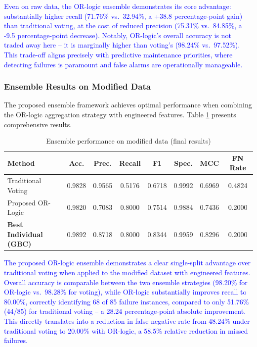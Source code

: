 \documentclass[final,5p, twocolumn]{elsarticle}
\begin{document}
\textcolor{blue}{Even on raw data, the OR-logic ensemble demonstrates its core advantage: substantially higher recall (71.76\% vs.\ 32.94\%, a +38.8 percentage-point gain) than traditional voting, at the cost of reduced precision (75.31\% vs.\ 84.85\%, a -9.5 percentage-point decrease). Notably, OR-logic's overall accuracy is not traded away here -- it is marginally higher than voting's (98.24\% vs.\ 97.52\%). This trade-off aligns precisely with predictive maintenance priorities, where detecting failures is paramount and false alarms are operationally manageable.}

\subsubsection{Ensemble Results on Modified Data}

The proposed ensemble framework achieves optimal performance when combining the OR-logic aggregation strategy with engineered features. Table \ref{tab:ensemble_modified} presents comprehensive results.

\begin{table}[htbp]
\centering
\caption{Ensemble performance on modified data (final results)}
\label{tab:ensemble_modified}
\begin{tabular}{lccccccc}
\hline
\textbf{Method} & \textbf{Acc.} & \textbf{Prec.} & \textbf{Recall} & \textbf{F1} & \textbf{Spec.} & \textbf{MCC} & \textbf{FN Rate} \\
\hline
Traditional Voting & 0.9828 & 0.9565 & 0.5176 & 0.6718 & 0.9992 & 0.6969 & 0.4824 \\
Proposed OR-Logic & 0.9820 & 0.7083 & 0.8000 & 0.7514 & 0.9884 & 0.7436 & 0.2000 \\
\hline
\textbf{Best Individual (GBC)} & 0.9892 & 0.8718 & 0.8000 & 0.8344 & 0.9959 & 0.8296 & 0.2000 \\
\hline
\end{tabular}
\end{table}

\textcolor{blue}{The proposed OR-logic ensemble demonstrates a clear single-split advantage over traditional voting when applied to the modified dataset with engineered features. Overall accuracy is comparable between the two ensemble strategies (98.20\% for OR-logic vs.\ 98.28\% for voting), while OR-logic substantially improves recall to 80.00\%, correctly identifying 68 of 85 failure instances, compared to only 51.76\% (44/85) for traditional voting -- a 28.24 percentage-point absolute improvement. This directly translates into a reduction in false negative rate from 48.24\% under traditional voting to 20.00\% with OR-logic, a 58.5\% relative reduction in missed failures.}
\end{document}
